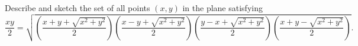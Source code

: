 Describe and sketch the set of all points $(x,y)$ in the plane satisfying
\[
\dfrac{xy}{2}=\sqrt{\left(\dfrac{x+y+\sqrt{x^{2}+y^{2}}}{2}\right)\left(\dfrac{x-y+\sqrt{x^{2}+y^{2}}}{2}\right)\left(\dfrac{y-x+\sqrt{x^{2}+y^{2}}}{2}\right)\left(\dfrac{x+y-\sqrt{x^2+y^2}}{2}\right)} .
\]
